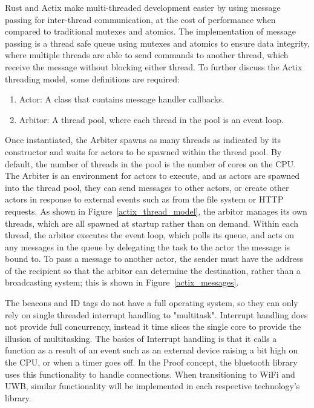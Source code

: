\bigskip
Rust and Actix make multi-threaded development easier by using message passing for inter-thread communication, at the cost of performance when compared to traditional mutexes and atomics.
The implementation of message passing is a thread safe queue using mutexes and atomics to ensure data integrity, where multiple threads are able to send commands to another thread, which receive the message without blocking either thread.
To further discuss the Actix threading model, some definitions are required:
\begin{enumerate}
	\item Actor: A class that contains message handler callbacks.
	\item Arbitor: A thread pool, where each thread in the pool is an event loop.
\end{enumerate}
Once instantiated, the \Gls{Arbiter} spawns as many threads as indicated by its constructor and waits for actors to be spawned within the thread pool.
By default, the number of threads in the pool is the number of cores on the CPU.
The \Gls{Arbiter} is an environment for actors to execute, and as actors are spawned into the thread pool, they can send messages to other actors, or create other actors in response to external events such as from the file system or HTTP requests.
As shown in Figure~\ref{actix_thread_model}, the arbitor manages its own threads, which are all spawned at startup rather than on demand.
Within each thread, the arbitor executes the event loop, which polls its queue, and acts on any messages in the queue by delegating the task to the actor the message is bound to.
To pass a message to another actor, the sender must have the address of the recipient so that the arbitor can determine the destination, rather than a broadcasting system; this is shown in Figure~\ref{actix_messages}.

\bigskip
The beacons and ID tags do not have a full operating system, so they can only rely on single threaded interrupt handling to "multitask".
Interrupt handling does not provide full concurrency, instead it time slices the single core to provide the illusion of multitasking.
The basics of Interrupt handling is that it calls a function as a result of an event such as an external device raising a bit high on the CPU, or when a timer goes off.
In the Proof concept, the bluetooth library uses this functionality to handle connections.
When transitioning to WiFi and UWB, similar functionality will be implemented in each respective technology's library.

